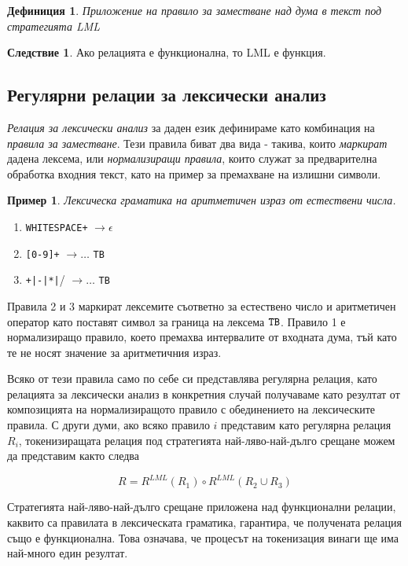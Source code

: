 \documentclass[12pt, oneside]{article}
\theoremstyle{definition}
\newtheorem{definition}{Дефиниция}[section]
\newtheorem{example}{Пример}[section]
\newtheorem{corollary}{Следствие}[section]
\begin{document}
\begin{definition}
	\emph{Приложение на правило за заместване над дума в текст под стратегията LML}
\end{definition}

\begin{corollary}
	Ако релацията е функционална, то LML е функция.
\end{corollary}

\subsection{Регулярни релации за лексически анализ}

\emph{Релация за лексически анализ} за даден език дефинираме като комбинация на \emph{правила за заместване}. Тези правила биват два вида - такива, които \emph{маркират} дадена лексема, или \emph{нормализиращи правила}, които служат за предварителна обработка входния текст, като на пример за премахване на излишни символи.

\begin{example}{\emph{Лексическа граматика на аритметичен израз от естествени числа.}}
	\begin{enumerate}
		\item \verb/WHITESPACE+/ \( \to \epsilon \)
		\item \verb/[0-9]+/ \( \to \dots \) \verb/TB/
		\item \verb/+|-|*|// \( \to \dots \) \verb/TB/
	\end{enumerate}
\end{example}

Правила 2 и 3 маркират лексемите съответно за естествено число и аритметичен оператор като поставят символ за граница на лексема \( \verb/TB/ \). Правило 1 е нормализиращо правило, което премахва интервалите от входната дума, тъй като те не носят значение за аритметичния израз.

Всяко от тези правила само по себе си представлява регулярна релация, като релацията за лексически анализ в конкретния случай получаваме като резултат от композицията на нормализиращото правило с обединението на лексическите правила. С други думи, ако всяко правило \(i\) представим като регулярна релация \(R_i\), токенизиращата релация под стратегията най-ляво-най-дълго срещане можем да представим както следва

\[ R = R^{LML}(R_1) \circ R^{LML}(R_2 \cup R_3) \]

Стратегията най-ляво-най-дълго срещане приложена над функционални релации, каквито са правилата в лексическата граматика, гарантира, че получената релация също е функционална. Това означава, че процесът на токенизация винаги ще има най-много един резултат.
\end{document}
